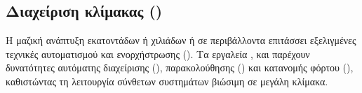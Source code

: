 \subsection{Διαχείριση κλίμακας ()}

Η μαζική ανάπτυξη εκατοντάδων ή χιλιάδων  ή  σε περιβάλλοντα  επιτάσσει εξελιγμένες τεχνικές αυτοματισμού και ενορχήστρωσης (). Τα εργαλεία ,  και  παρέχουν δυνατότητες αυτόματης διαχείρισης (), παρακολούθησης () και κατανομής φόρτου (), καθιστώντας τη λειτουργία σύνθετων συστημάτων βιώσιμη σε μεγάλη κλίμακα.





